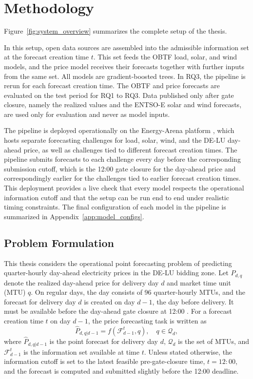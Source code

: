\section{Methodology}
\label{sec:methodology}

Figure~\ref{fig:system_overview} summarizes the complete setup of the thesis.



In this setup, open data sources are assembled into the admissible information
set at the forecast creation time \(t\). This set feeds the OBTF load, solar, and wind models,
and the price model receives their forecasts together with further inputs from
the same set. All models are gradient-boosted trees. In RQ3, the pipeline is
rerun for each forecast creation time. The OBTF and price forecasts are
evaluated on the test period for RQ1 to RQ3. Data published only after gate
closure, namely the realized values and the \mbox{ENTSO-E} solar and wind
forecasts, are used only for evaluation and never as model inputs.

The pipeline is deployed operationally on the Energy-Arena platform
\cite{kleinebrahm2026energyarena}, which hosts separate forecasting challenges
for load, solar, wind, and the \mbox{DE-LU} day-ahead price, as
well as challenges tied to different forecast creation times. The pipeline
submits forecasts to each challenge every day before the corresponding
submission cutoff, which is the 12:00 gate closure for the day-ahead price
and correspondingly earlier for the challenges tied to earlier forecast
creation times. This deployment provides a live check that every model respects
the operational information cutoff and that the setup can be run end to end
under realistic timing constraints. The final configuration of each model in the
pipeline is summarized in Appendix~\ref{app:model_configs}.


\subsection{Problem Formulation}
\label{sec:problem_formulation}

This thesis considers the operational point forecasting problem of predicting
quarter-hourly day-ahead electricity prices in the \mbox{DE-LU} bidding zone. Let
\(P_{d,q}\) denote the realized day-ahead price for delivery
day \(d\) and market time unit (MTU) \(q\). On regular days, the day consists of
96 quarter-hourly MTUs, and the forecast for delivery day \(d\)
is created on day \(d-1\), the day before delivery. It must be available
before the day-ahead gate closure at
12:00 \cite{epexSpotPowerMarket}. For a forecast creation time
\(t\) on day \(d-1\), the price forecasting task is written as
\[
  \hat{P}_{d,q|d-1} = f(\mathcal{F}_{d-1}^{t}, q),
  \quad q \in \mathcal{Q}_d,
\]
where \(\hat{P}_{d,q|d-1}\) is the point forecast for delivery day \(d\),
\(\mathcal{Q}_d\) is the set of MTUs, and
\(\mathcal{F}_{d-1}^{t}\) is the information set available at time \(t\). Unless
stated otherwise, the information cutoff is set to the latest feasible
pre-gate-closure time, \(t=12{:}00\), and the forecast is computed and submitted
slightly before the 12:00 deadline.

